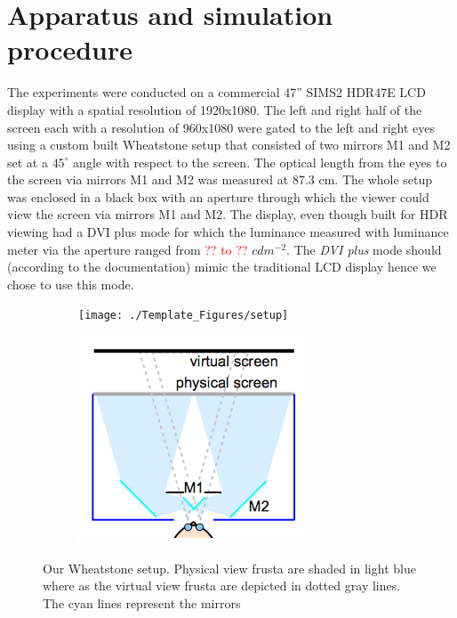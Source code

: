 \section{Apparatus and simulation procedure}
The experiments were conducted on a commercial 47'' SIMS2 HDR47E LCD display with a spatial resolution of 1920x1080. The left and right half of the screen each with a resolution of 960x1080 were gated to the left and right eyes using a custom built Wheatstone setup \cite{ wiki:wheatstone} that consisted of two mirrors M1 and M2 set at a $45^\circ$ angle with respect to the screen. The optical length from the eyes to the screen via mirrors M1 and M2 was measured at 87.3 cm. The whole setup was enclosed in a black box with an aperture through which the viewer could view the screen via mirrors M1 and M2. The display, even though built for HDR viewing had a DVI plus mode for which the luminance measured with luminance meter via the aperture ranged from \textcolor{red}{?? to ??} $cdm^{-2}$. The \emph{DVI plus} mode should (according to the documentation) mimic the traditional LCD display hence we chose to use this mode.
\begin{figure}[htbp]
    \begin{subfigure}[b]{0.5\textwidth}
        \texttt{[image: ./Template\_Figures/setup]}
        \caption{}\label{fig:setup}
    \end{subfigure}
    \begin{subfigure}[b]{0.4\textwidth}
        \includegraphics[width=\textwidth]{./Template_Figures/setup_sch}
        \caption{}\label{fig:setup_sch}
    \end{subfigure}
    \caption{Our Wheatstone setup. Physical view frusta are shaded in light blue where as the virtual view frusta are depicted in dotted gray lines. The cyan lines represent the mirrors \cite{vangorp2014depth}\label{fig:wheatstone_setup}}
\end{figure}

